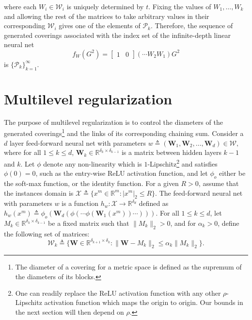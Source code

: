 \documentclass{article}
\newcommand{\pa}{\mathcal{P}}
\begin{document}
where each $W_i\in \mathcal{W}_i$ is uniquely determined by $t$. Fixing the values of $W_1,\dots, W_k$ and allowing the rest of the matrices to take arbitrary values in their corresponding $\mathcal{W}_i$ gives one of the elements of $\mathcal{P}_k$. Therefore, the sequence of generated coverings associated with the index set of the infinite-depth linear neural net 
\begin{equation}
	f_W(G^2)=\begin{bmatrix}
1 & 0	
\end{bmatrix}
\left(\cdots W_2W_1 \right)G^2\nonumber
\end{equation}
is $\{\pa_k\}_{k=1}^{\infty}$. 
\section{Multilevel regularization}\label{multilevel regularization section}
The purpose of multilevel regularization is to control the diameters of the generated coverings\footnote{The diameter of a covering for a metric space is defined as the supremum of the diameters of its blocks.} and the links of its corresponding chaining sum. Consider a $d$ layer feed-forward neural net with parameters
	$
		w\triangleq (\mathbf{W}_1,\mathbf{W}_2,\dots,\mathbf{W}_d)\in \mathcal{W},
	$ 
	where for all $1\leq k\leq d$, $\mathbf{W}_k\in\mathbb{R}^{\delta_{k}\times\delta_{k-1}}$ is a matrix 
	between hidden layers $k-1$ and $k$.
	 Let $\phi$ denote any non-linearity which is $1$-Lipschitz\footnote{One can readily replace the ReLU activation function with any other $\rho$-Lipschitz activation function which maps the origin to origin. Our bounds in the next section will then depend on $\rho$.} and satisfies $\phi(0)=0$, such as the 
	 entry-wise ReLU activation function, and let $\phi_o$ either be the soft-max function, or the identity function. For a given $R>0$, assume that the instances domain is $\mathcal{X}\triangleq\{x^m\in \mathbb{R}^m: |x^m|_2\leq R \}$. The feed-forward neural net with parameters $w$ is a function $h_w: \mathcal{X} \to \mathbb{R}^{\delta_d}$ defined as 
 $
 	h_w(x^m)\triangleq \phi_o(\mathbf{W}_d(\phi (\cdots \phi(\mathbf{W}_1 (x^m))\cdots))).
 $
For all $1\leq k \leq d$, let $M_k\in\mathbb{R}^{\delta_{k}\times\delta_{k-1}}$ be a fixed matrix 
such that $\|M_k\|_2>0$, and for $\alpha_k>0$, define the following set of matrices:
	\begin{equation}\label{multilevel regularization equation}
		\mathcal{W}_k\triangleq \{\mathbf{W}\in \mathbb{R}^{\delta_{k+1}\times\delta_k}: \|\mathbf{W}-M_k\|_2\leq \alpha_k\|M_k\|_2 \}.
	\end{equation} 
\end{document}
